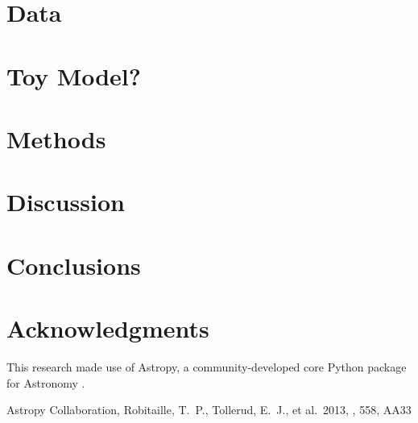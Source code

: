 \documentclass[useAMS,usenatbib]{mn2e}
\begin{document}
\section[]{Data}

\section[]{Toy Model?}

\section[]{Methods}

\section[]{Discussion}

\section{Conclusions}


\section*{Acknowledgments}
This research made use of Astropy, a community-developed core Python package for Astronomy \citep{astropy}.


\begin{thebibliography}{99}
 Astropy Collaboration, Robitaille, T.~P., Tollerud, E.~J., et al.\ 2013, \aap, 558, AA33
\end{thebibliography}


\label{lastpage}
\end{document}
